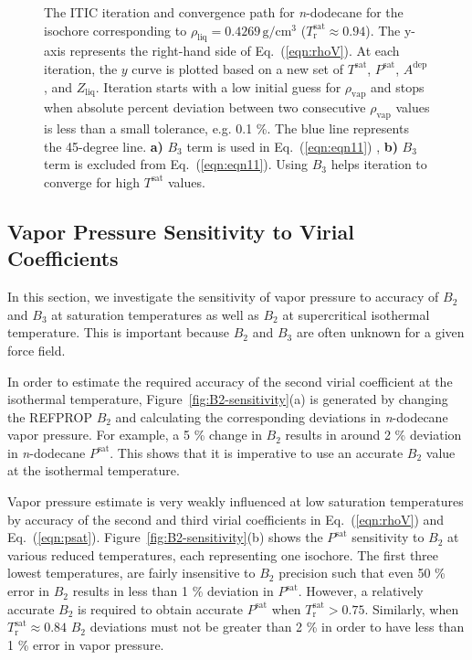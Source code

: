 \documentclass[5p,times]{elsarticle}
\begin{document}
\begin{figure}
\caption{
The ITIC iteration and convergence path for \textit{n}-dodecane for the isochore corresponding to $\rho_{\mathrm{liq}}=0.4269\,\mathrm{g/cm^3}$ ($T_\mathrm{r}^\mathrm{sat} \approx 0.94$). The y-axis represents the right-hand side of Eq.~(\ref{eqn:rhoV}). At each iteration, the $y$ curve is plotted based on a new set of $T^{\mathrm{sat}}$, $P^{\mathrm{sat}}$, $A^\mathrm{dep}$, and $Z_{\mathrm{liq}}$. Iteration starts with a low initial guess for $\rho_{\mathrm{vap}}$ and stops when absolute percent deviation between two consecutive $\rho_{\mathrm{vap}}$ values is less than a small tolerance, e.g. 0.1 \%.
The blue line represents the 45-degree line. \textbf{a)} $B_3$ term is used in Eq.~(\ref{eqn:eqn11})
, \textbf{b)} $B_3$ term is excluded from Eq.~(\ref{eqn:eqn11}). Using $B_3$ helps iteration to converge for high $T^{\mathrm{sat}}$ values.}
\label{fig:convergence-path}
\end{figure}

\subsection{Vapor Pressure Sensitivity to Virial Coefficients} \label{sec:Bx-Sensitivity}
In this section, we investigate the sensitivity of vapor pressure to accuracy of $B_2$ and $B_3$ at saturation temperatures as well as $B_2$ at supercritical isothermal temperature. This is important because $B_2$ and $B_3$ are often unknown for a given force field. 

In order to estimate the required accuracy of the second virial coefficient at the isothermal temperature, Figure~\ref{fig:B2-sensitivity}(a) is generated by changing the REFPROP $B_2$ and calculating the corresponding deviations in \textit{n}-dodecane vapor pressure. For example, a 5 \% change in $B_2$ results in around 2 \% deviation in \textit{n}-dodecane $P^{\mathrm{sat}}$. This shows that it is imperative to use an accurate $B_2$ value at the isothermal temperature.

Vapor pressure estimate is very weakly influenced at low saturation temperatures by accuracy of the second and third virial coefficients in Eq.~(\ref{eqn:rhoV}) and Eq.~(\ref{eqn:psat}). Figure~\ref{fig:B2-sensitivity}(b) shows the $P^{\mathrm{sat}}$ sensitivity to $B_2$ at various reduced temperatures, each representing one isochore. The first three lowest temperatures, are fairly insensitive to $B_2$ precision such that even 50 \% error in $B_2$ results in less than 1 \% deviation in $P^{\mathrm{sat}}$. However, a relatively accurate $B_2$ is required to obtain accurate $P^{\mathrm{sat}}$ when $T_\mathrm{r}^\mathrm{sat}>0.75$. Similarly, when $T_\mathrm{r}^\mathrm{sat} \approx 0.84$ $B_2$ deviations must not be greater than 2 \% in order to have less than 1 \% error in vapor pressure.
\end{document}
